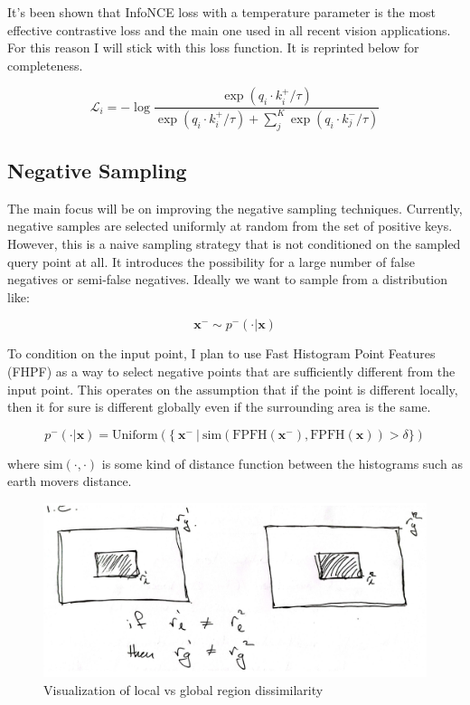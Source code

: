 \documentclass[12pt]{article}
\begin{document}
It's been shown that InfoNCE loss with a temperature parameter is the most effective contrastive loss and the main one used in all recent vision applications. For this reason I will stick with this loss function. It is reprinted below for completeness.

$$\mathcal{L}_{i} = -\log \frac{\exp(q_{i} \cdot k^{+}_{i} / \tau)}{\exp(q_{i} \cdot k^{+}_{i} / \tau) + \sum^{K}_{j}\exp(q_{i} \cdot k^{-}_{j} / \tau)}$$

\subsection{Negative Sampling}

The main focus will be on improving the negative sampling techniques. Currently, negative samples are selected uniformly at random from the set of positive keys. However, this is a naive sampling strategy that is not conditioned on the sampled query point at all. It introduces the possibility for a large number of false negatives or semi-false negatives. Ideally we want to sample from a distribution like:

$$\mathbf{x}^{-} \sim p^{-}( \cdot | \mathbf{x})$$

To condition on the input point, I plan to use Fast Histogram Point Features (FHPF) as a way to select negative points that are sufficiently different from the input point. This operates on the assumption that if the point is different locally, then it for sure is different globally even if the surrounding area is the same.

$$p^{-}( \cdot | \mathbf{x}) = \text{Uniform}(\{ \: \mathbf{x}^- \: | \: \text{sim}(\text{FPFH}(\mathbf{x}^-),\text{FPFH}(\mathbf{x})) > \delta \})$$

where $\text{sim}(\cdot,\cdot)$ is some kind of distance function between the histograms such as earth movers distance.

\begin{figure}[h!]
    \begin{center}
        \includegraphics[scale=0.3]{images/regions.png}
        \caption{Visualization of local vs global region dissimilarity}
    \end{center}
\end{figure}
\end{document}
